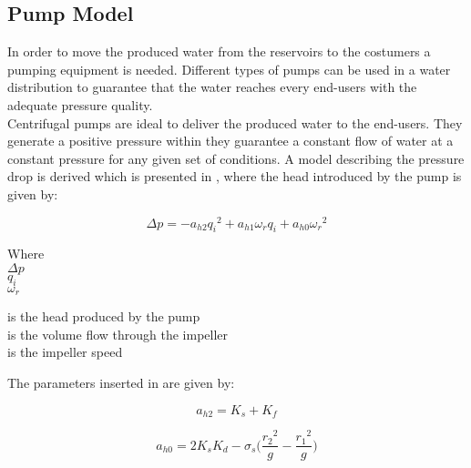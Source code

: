 \subsection{Pump Model} 
\label{PumpModel}
In order to move the produced water from the reservoirs to the costumers a 
pumping equipment is needed.  Different types of pumps can be used in a water distribution to 
guarantee that the water reaches every end-users with the adequate pressure 
quality.\\
Centrifugal pumps are ideal to deliver the produced water to the end-users. 
They generate a positive pressure within they guarantee a constant flow of water at a constant pressure for any given set of conditions. 
A model describing the pressure drop is derived which is presented in 
\cite{Phd_Carsten}, where the head introduced by the pump is given by:

\begin{equation}
  \Delta p = -a_{h2}{q_i}^2 + a_{h1} \omega_r q_i + a_{h0}{\omega_r}^2
  \label{PumpModel}
\end{equation}

\begin{minipage}[t]{0.20\textwidth}
Where\\
\hspace*{8mm} $\Delta p$ \\
\hspace*{8mm} $q_i$ \\
\hspace*{8mm} $\omega_r$ 

\end{minipage}
\begin{minipage}[t]{0.68\textwidth}
\vspace*{2mm}
is the head produced by the pump\\
is the volume flow through the impeller\\
is the impeller speed
\end{minipage}


The parameters inserted in  are given by:

\begin{minipage}[t]{0.20\textwidth}
\begin{equation*}
  a_{h2} = K_s + K_f
\end{equation*}
\end{minipage}
\begin{minipage}[t]{0.68\textwidth}
\begin{equation*}
  a_{h0} = 2K_sK_d - \sigma_s 
  \bigg(\frac{{r_2}^2}{g}-\frac{{r_1}^2}{g}\bigg)
\end{equation*}
\end{minipage}

